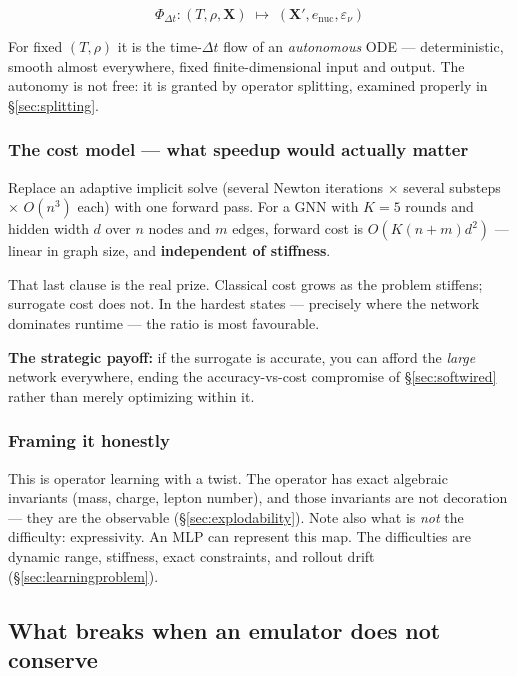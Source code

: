 \begin{equation*}
\Phi_{\Delta t} : (T, \rho, \mathbf{X}) \;\mapsto\;
(\mathbf{X}', e_{\text{nuc}}, \varepsilon_\nu)
\end{equation*}

For fixed $(T, \rho)$ it is the time-$\Delta t$ flow of an \emph{autonomous} ODE
--- deterministic, smooth almost everywhere, fixed finite-dimensional input and
output. The autonomy is not free: it is granted by operator splitting, examined
properly in \S\ref{sec:splitting}.

\subsubsection{The cost model --- what speedup would actually matter}
\label{sec:costmodel}

Replace an adaptive implicit solve (several Newton iterations $\times$ several
substeps $\times$ $O(n^3)$ each) with one forward pass. For a GNN with $K = 5$
rounds and hidden width $d$ over $n$ nodes and $m$ edges, forward cost is
$O(K(n + m)d^2)$ --- linear in graph size, and \textbf{independent of
stiffness}.

That last clause is the real prize. Classical cost grows as the problem
stiffens; surrogate cost does not. In the hardest states --- precisely where the
network dominates runtime --- the ratio is most favourable.

\textbf{The strategic payoff:} if the surrogate is accurate, you can afford the
\emph{large} network everywhere, ending the accuracy-vs-cost compromise of
\S\ref{sec:softwired} rather than merely optimizing within it.

\subsubsection{Framing it honestly}
\label{sec:framinghonestly}

This is operator learning with a twist. The operator has exact algebraic
invariants (mass, charge, lepton number), and those invariants are not
decoration --- they are the observable (\S\ref{sec:explodability}). Note also
what is \emph{not} the difficulty: expressivity. An MLP can represent this map.
The difficulties are dynamic range, stiffness, exact constraints, and rollout
drift (\S\ref{sec:learningproblem}).

\subsection{What breaks when an emulator does not conserve}
\label{sec:conservationfailure}

